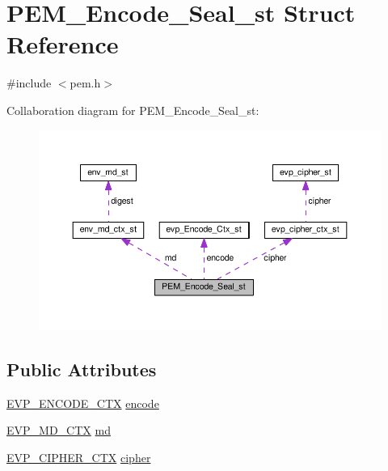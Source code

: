 \hypertarget{struct_p_e_m___encode___seal__st}{}\section{P\+E\+M\+\_\+\+Encode\+\_\+\+Seal\+\_\+st Struct Reference}
\label{struct_p_e_m___encode___seal__st}


{\ttfamily \#include $<$pem.\+h$>$}



Collaboration diagram for P\+E\+M\+\_\+\+Encode\+\_\+\+Seal\+\_\+st\+:
\nopagebreak
\begin{figure}[H]
\begin{center}
\leavevmode
\includegraphics[width=350pt]{struct_p_e_m___encode___seal__st__coll__graph}
\end{center}
\end{figure}
\subsection*{Public Attributes}
\begin{DoxyCompactItemize}
\item 
\hyperlink{evp_8h_abaf2c67a32853bb1480c30819be5735e}{E\+V\+P\+\_\+\+E\+N\+C\+O\+D\+E\+\_\+\+C\+TX} \hyperlink{struct_p_e_m___encode___seal__st_a47cfc43decced4ead8d4939f37ff5d32}{encode}
\item 
\hyperlink{ossl__typ_8h_a69cda4d21bd068f01c469222c1dd92fe}{E\+V\+P\+\_\+\+M\+D\+\_\+\+C\+TX} \hyperlink{struct_p_e_m___encode___seal__st_abdc58bdc153bb43dcf29e7a6a339f8bd}{md}
\item 
\hyperlink{ossl__typ_8h_aab2bd6a044e1d31ebc2fe82b3b0b3d9a}{E\+V\+P\+\_\+\+C\+I\+P\+H\+E\+R\+\_\+\+C\+TX} \hyperlink{struct_p_e_m___encode___seal__st_a5a3c09ebd5be8036df38f8f623f5ef79}{cipher}
\end{DoxyCompactItemize}


